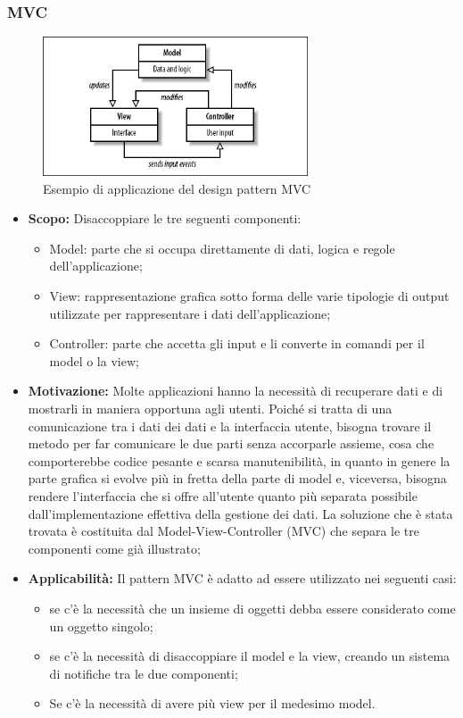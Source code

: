 \documentclass{scalatekids-article}
\begin{document}
\subsubsection{MVC}
\begin{figure}[H]
	\begin{center}
		\includegraphics[width=0.7\textwidth, keepaspectratio]{img/designPattern/mvc.jpg}
		\caption{Esempio di applicazione del design pattern MVC}
	\end{center}
\end{figure}
\begin{itemize}
	\item \textbf{Scopo:} Disaccoppiare le tre seguenti componenti:
	\begin{itemize}
		\item Model: parte che si occupa direttamente di dati, logica e regole dell'applicazione;
		\item View: rappresentazione grafica sotto forma delle varie tipologie di output utilizzate per rappresentare i dati dell'applicazione;
		\item Controller: parte che accetta gli input e li converte in comandi per il model o la view;
	\end{itemize}
	 \item \textbf{Motivazione:} Molte applicazioni hanno la necessità di recuperare dati e di mostrarli in maniera opportuna agli utenti. Poiché si tratta di una comunicazione tra i dati dei dati e la interfaccia utente, bisogna trovare il metodo per far comunicare le due parti senza accorparle assieme, cosa che comporterebbe codice pesante e scarsa manutenibilità, in quanto in genere la parte grafica si evolve più in fretta della parte di model e, viceversa, bisogna rendere l'interfaccia che si offre all'utente quanto più separata possibile dall'implementazione effettiva della gestione dei dati. La soluzione che è stata trovata è costituita dal  Model-View-Controller (MVC) che separa le tre componenti come già illustrato; 
	 \item \textbf{Applicabilità:} Il pattern MVC è adatto ad essere utilizzato nei seguenti casi: 
	 \begin{itemize} 
	 	\item se c'è la necessità che un insieme di oggetti debba essere considerato come un oggetto singolo;
	 	\item se c'è la necessità di disaccoppiare il model e la view, creando un sistema di notifiche tra le due componenti; 
	 	\item Se c'è la necessità di avere più view per il medesimo model.
\end{itemize}
\end{itemize}
\end{document}
